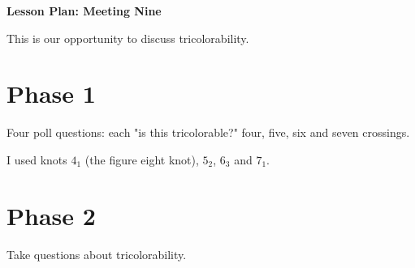 \documentclass[12pt]{amsart}
\theoremstyle{definition}
\begin{document}
\begin{center}
\textbf{\Huge
Lesson Plan: Meeting Nine
}
\end{center}
\vspace{.5in}

This is our opportunity to discuss tricolorability.

\section{Phase 1} 

Four poll questions: each "is this tricolorable?"  four, five, six and seven crossings.

I used knots $4_1$ (the figure eight knot), $5_2$, $6_3$ and $7_1$.

\section{Phase 2}
Take questions about tricolorability.
\end{document}
